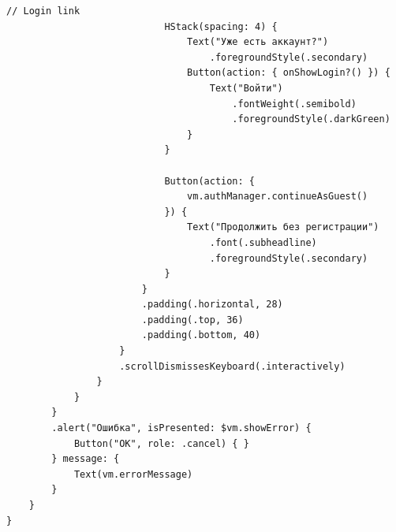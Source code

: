 \begin{lstlisting}[basicstyle=\tiny\ttfamily,breaklines=true]
                            // Login link
                            HStack(spacing: 4) {
                                Text("Уже есть аккаунт?")
                                    .foregroundStyle(.secondary)
                                Button(action: { onShowLogin?() }) {
                                    Text("Войти")
                                        .fontWeight(.semibold)
                                        .foregroundStyle(.darkGreen)
                                }
                            }
                            
                            Button(action: {
                                vm.authManager.continueAsGuest()
                            }) {
                                Text("Продолжить без регистрации")
                                    .font(.subheadline)
                                    .foregroundStyle(.secondary)
                            }
                        }
                        .padding(.horizontal, 28)
                        .padding(.top, 36)
                        .padding(.bottom, 40)
                    }
                    .scrollDismissesKeyboard(.interactively)
                }
            }
        }
        .alert("Ошибка", isPresented: $vm.showError) {
            Button("OK", role: .cancel) { }
        } message: {
            Text(vm.errorMessage)
        }
    }
}
\end{lstlisting}

